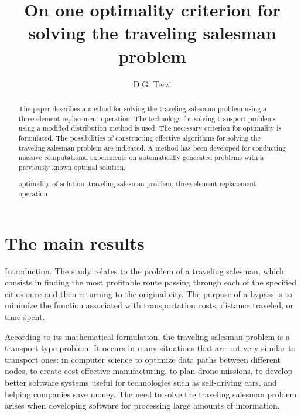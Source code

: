 \documentclass[12pt]{llncs}
\begin{document}
\fi

\title{On one optimality criterion for solving the  traveling salesman problem}

\author{D.G. Terzi}


\maketitle



\begin{abstract}
    The paper describes a method for solving the traveling salesman problem using a
    three-element replacement operation. The technology for solving transport problems using a modified distribution method is used. The necessary criterion for optimality is formulated. The possibilities of constructing effective algorithms for solving the traveling salesman problem are indicated. A method has been developed for conducting massive computational experiments on automatically generated problems with a previously known optimal solution.

optimality of solution, traveling salesman problem, three-element replacement operation
\end{abstract}

\section{The main results}
 Introduction. The study relates to the problem of a traveling salesman, which consists in finding the most profitable route passing through each of the specified cities once and then returning to the original city. The purpose of a bypass is to minimize the function associated with transportation costs, distance traveled, or time spent.

     According to its mathematical formulation, the traveling salesman problem is a transport type problem.
     It occurs in many situations that are not very similar to transport ones: in computer science to optimize data paths between
     different nodes, to create cost-effective manufacturing, to plan drone missions, to develop better software systems useful for technologies
     such as self-driving cars, and helping companies save money. The need to solve the traveling salesman problem arises when developing software
      for processing large amounts of information.
\end{document}
